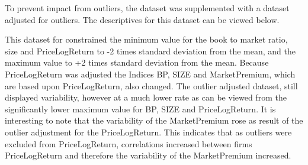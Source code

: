 To prevent impact from outliers, the dataset was supplemented with a dataset adjusted for outliers. The descriptives for this dataset can be viewed below.
\begin{table}[H] 
\centering
\caption{Descriptive statistics variables outlier adjusted} 
\end{table} 
This dataset for constrained the minimum value for the book to market ratio, size and PriceLogReturn to -2 times standard deviation from the mean, and the maximum value to +2 times standard deviation from the mean. Because PriceLogReturn was adjusted the Indices BP, SIZE and MarketPremium, which are based upon PriceLogReturn, also changed. The outlier adjusted dataset, still displayed variability, however at a much lower rate as can be viewed from the significantly lower maximum value for BP, SIZE and PriceLogReturn. It is interesting to note that the variability of the MarketPremium rose as result of the outlier adjustment for the PriceLogReturn. This indicates that as outliers were excluded from PriceLogReturn, correlations increased between firms PriceLogReturn and therefore the variability of the MarketPremium increased.

